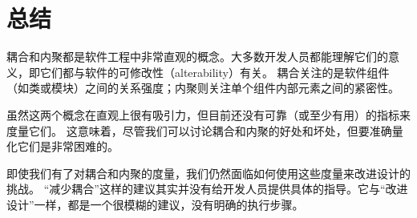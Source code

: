 \section{总结}
耦合和内聚都是软件工程中非常直观的概念。大多数开发人员都能理解它们的意义，即它们都与软件的可修改性（alterability）有关。
耦合关注的是软件组件（如类或模块）之间的关系强度；内聚则关注单个组件内部元素之间的紧密性。

虽然这两个概念在直观上很有吸引力，但目前还没有可靠（或至少有用）的指标来度量它们。
这意味着，尽管我们可以讨论耦合和内聚的好处和坏处，但要准确量化它们是非常困难的。

即使我们有了对耦合和内聚的度量，我们仍然面临如何使用这些度量来改进设计的挑战。
“减少耦合”这样的建议其实并没有给开发人员提供具体的指导。它与“改进设计”一样，都是一个很模糊的建议，没有明确的执行步骤。